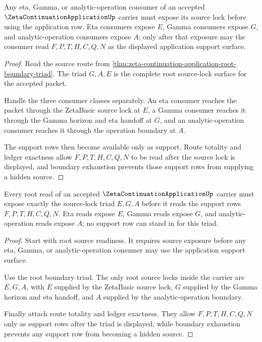 \begin{theorem}
\label{thm:zeta-continuation-application-root-source-readiness}
Any eta, Gamma, or analytic-operation consumer of an accepted $\ZetaContinuationApplicationUp$ carrier must expose its source lock before using the application row. Eta consumers expose $E$, Gamma consumers expose $G$, and analytic-operation consumers expose $A$; only after that exposure may the consumer read $F,P,T,H,C,Q,N$ as the displayed application support surface.
\end{theorem}
\begin{proof}
Read the source route from \autoref{thm:zeta-continuation-application-root-boundary-triad}. The triad $G,A,E$ is the complete root source-lock surface for the accepted packet.

Handle the three consumer classes separately. An eta consumer reaches the packet through the ZetaBasic source lock at $E$, a Gamma consumer reaches it through the Gamma horizon and eta handoff at $G$, and an analytic-operation consumer reaches it through the operation boundary at $A$.

The support rows then become available only as support. Route totality and ledger exactness allow $F,P,T,H,C,Q,N$ to be read after the source lock is displayed, and boundary exhaustion prevents those support rows from supplying a hidden source.
\end{proof}

\begin{theorem}
\label{thm:zeta-continuation-application-root-source-lock-exhaustion}
Every root read of an accepted $\ZetaContinuationApplicationUp$ carrier must expose exactly the source-lock triad $E,G,A$ before it reads the support rows $F,P,T,H,C,Q,N$. Eta reads expose $E$, Gamma reads expose $G$, and analytic-operation reads expose $A$; no support row can stand in for this triad.
\end{theorem}
\begin{proof}
Start with root source readiness. It requires source exposure before any eta, Gamma, or analytic-operation consumer may use the application support surface.

Use the root boundary triad. The only root source locks inside the carrier are $E,G,A$, with $E$ supplied by the ZetaBasic source lock, $G$ supplied by the Gamma horizon and eta handoff, and $A$ supplied by the analytic-operation boundary.

Finally attach route totality and ledger exactness. They allow $F,P,T,H,C,Q,N$ only as support rows after the triad is displayed, while boundary exhaustion prevents any support row from becoming a hidden source.
\end{proof}

